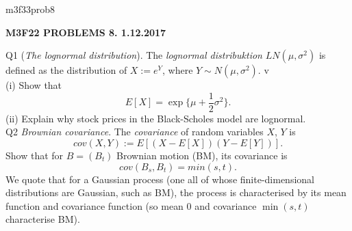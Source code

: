\documentclass[12pt]{article}
\begin{document}
\def\R{\mathbb{R}}
\def\C{\mathbb{C}}
\def\Z{\mathbb{Z}}
\def\N{\mathbb{N}}
\def\Q{\mathbb{Q}}
\def\D{\mathbb{D}}
\def\Sp{{\mathbb{S}}}
\def\T{\mathbb{T}}
\def\H{\mathbb{H}}
\def\hb{\hfil \break}
\def\ni{\noindent}
\def\i{\indent}
\def\a{\alpha}
\def\b{\beta}
\def\e{\epsilon}
\def\d{\delta}
\def\D{\Delta}
\def\G{\Gamma}
\def\g{\gamma}
\def\l{\lambda}
\def\m{\mu}
\def\s{\sigma}
\def\Si{\Sigma}
\def\th{\theta}
\def\z{\zeta}
\def\p{\partial}
\def\o{\omega}
\def\O{\Omega}
\def\t{\tau}
\def\L{\it \char'44}
\def\F{\mathcal{F}}
\def\B{\mathcal{B}}
\def\C{\mathcal{C}}
\def\half{\frac{1}{2}}
\ni m3f33prob8 \\
\begin{center}
{\bf M3F22 PROBLEMS 8.  1.12.2017} 
\end{center}

\ni Q1 ({\it The lognormal distribution}).  The {\it lognormal distribuktion} $LN(\mu, {\s}^2)$ is defined as the distribution of $X := e^Y$, where $Y \sim N(\mu, {\s}^2)$. v\\
(i) Show that
$$
E[X] = \exp \{ \mu + \half {\s}^2 \}.
$$
(ii) Explain why stock prices in the Black-Scholes model are lognormal. \\

\ni Q2 {\it Brownian covariance}.  The {\it covariance} of random variables $X$, $Y$ is
$$
cov(X,Y) := E[(X - E[X])(Y - E[Y])].
$$
Show that for $B = (B_t)$ Brownian motion (BM), its covariance is
$$
cov(B_s,B_t) = min(s,t).
$$
\i We quote that for a Gaussian process (one all of whose finite-dimensional distributions are Gaussian, such as BM), the process is characterised by its mean function and covariance function (so mean 0 and covariance $\min(s,t)$ characterise BM). \\
\end{document}

